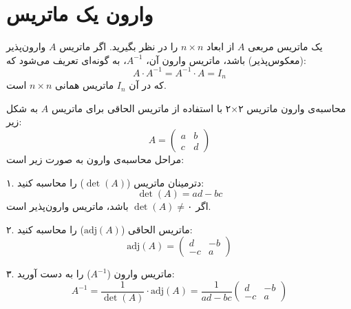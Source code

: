 \section{وارون یک ماتریس}
	
\begin{definition}
	
	یک ماتریس مربعی \( A \) از ابعاد \( n \times n \) را در نظر بگیرید. اگر ماتریس \( A \) وارون‌پذیر (معکوس‌پذیر) باشد، ماتریس وارون آن، \( A^{-1} \)، به گونه‌ای تعریف می‌شود که:
	\[
	A \cdot A^{-1} = A^{-1} \cdot A = I_n
	\]
	که در آن \( I_n \) ماتریس همانی \( n \times n \) است.
	

\end{definition}
	\begin{nokteh}
		
	محاسبه‌ی وارون ماتریس ۲×۲ با استفاده از ماتریس الحاقی
	برای ماتریس \( A \) به شکل زیر:
	\[
	A = \begin{pmatrix}
		a & b \\
		c & d
	\end{pmatrix}
	\]
	مراحل محاسبه‌ی وارون به صورت زیر است:
	
	۱. دترمینان ماتریس (\( \det(A) \)) را محاسبه کنید:
	\[
	\det(A) = ad - bc
	\]
	اگر \( \det(A) \neq ۰ \) باشد، ماتریس وارون‌پذیر است.
	
	۲. ماتریس الحاقی (\( \text{adj}(A) \)) را محاسبه کنید:
	\[
	\text{adj}(A) = \begin{pmatrix}
		d & -b \\
		-c & a
	\end{pmatrix}
	\]
	
	۳. ماتریس وارون (\( A^{-1} \)) را به دست آورید:
	\[
	A^{-1} = \frac{1}{\det(A)} \cdot \text{adj}(A) = \frac{1}{ad - bc} \begin{pmatrix}
		d & -b \\
		-c & a
	\end{pmatrix}
	\]
	

	\end{nokteh}
	
